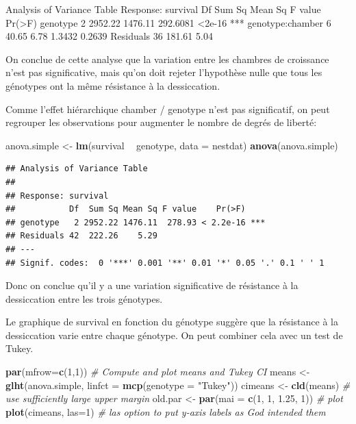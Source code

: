 \documentclass[12pt,]{book}
\newenvironment{Shaded}{\begin{snugshade}}{\end{snugshade}}
\newcommand{\CommentTok}[1]{\textcolor[rgb]{0.37,0.37,0.37}{\textit{#1}}}
\newcommand{\DataTypeTok}[1]{\textcolor[rgb]{0.27,0.27,0.27}{#1}}
\newcommand{\DecValTok}[1]{\textcolor[rgb]{0.06,0.06,0.06}{#1}}
\newcommand{\FloatTok}[1]{\textcolor[rgb]{0.06,0.06,0.06}{#1}}
\newcommand{\KeywordTok}[1]{\textcolor[rgb]{0.27,0.27,0.27}{\textbf{#1}}}
\newcommand{\NormalTok}[1]{#1}
\newcommand{\OperatorTok}[1]{\textcolor[rgb]{0.43,0.43,0.43}{\textbf{#1}}}
\newcommand{\StringTok}[1]{\textcolor[rgb]{0.5,0.5,0.5}{#1}}
\begin{document}
Analysis of Variance Table
Response: survival
Df Sum Sq Mean Sq F value Pr(\textgreater{}F)
genotype
2 2952.22 1476.11 292.6081 \textless{}2e-16 ***
genotype:chamber 6
40.65
6.78
1.3432 0.2639
Residuals
36 181.61
5.04

On conclue de cette analyse que la variation entre les chambres de croissance n'est pas significative, mais qu'on doit rejeter l'hypothèse nulle que tous les génotypes ont la même résistance à la dessiccation.

Comme l'effet hiérarchique chamber / genotype n'est pas significatif, on peut regrouper les observations pour augmenter le nombre de degrés de liberté:

\begin{Shaded}
\begin{Highlighting}[]
\NormalTok{anova.simple <-}\StringTok{ }\KeywordTok{lm}\NormalTok{(survival }\OperatorTok{~}\StringTok{ }\NormalTok{genotype, }\DataTypeTok{data =}\NormalTok{ nestdat)}
\KeywordTok{anova}\NormalTok{(anova.simple)}
\end{Highlighting}
\end{Shaded}

\begin{verbatim}
## Analysis of Variance Table
## 
## Response: survival
##           Df  Sum Sq Mean Sq F value    Pr(>F)    
## genotype   2 2952.22 1476.11  278.93 < 2.2e-16 ***
## Residuals 42  222.26    5.29                      
## ---
## Signif. codes:  0 '***' 0.001 '**' 0.01 '*' 0.05 '.' 0.1 ' ' 1
\end{verbatim}

Donc on conclue qu'il y a une variation significative de résistance à la dessiccation entre les trois génotypes.

Le graphique de survival en fonction du génotype suggère que la résistance à la dessiccation varie entre chaque génotype. On peut combiner cela avec un test de Tukey.

\begin{Shaded}
\begin{Highlighting}[]
\KeywordTok{par}\NormalTok{(}\DataTypeTok{mfrow=}\KeywordTok{c}\NormalTok{(}\DecValTok{1}\NormalTok{,}\DecValTok{1}\NormalTok{))}
\CommentTok{# Compute and plot means and Tukey CI}
\NormalTok{means <-}\StringTok{ }\KeywordTok{glht}\NormalTok{(anova.simple, }\DataTypeTok{linfct =} \KeywordTok{mcp}\NormalTok{(}\DataTypeTok{genotype =}
  \StringTok{"Tukey"}\NormalTok{))}
\NormalTok{cimeans <-}\StringTok{ }\KeywordTok{cld}\NormalTok{(means)}
\CommentTok{# use sufficiently large upper margin}
\NormalTok{old.par <-}\StringTok{ }\KeywordTok{par}\NormalTok{(}\DataTypeTok{mai =} \KeywordTok{c}\NormalTok{(}\DecValTok{1}\NormalTok{, }\DecValTok{1}\NormalTok{, }\FloatTok{1.25}\NormalTok{, }\DecValTok{1}\NormalTok{))}
\CommentTok{# plot}
\KeywordTok{plot}\NormalTok{(cimeans, }\DataTypeTok{las=}\DecValTok{1}\NormalTok{) }\CommentTok{# las option to put y-axis labels as God intended them}
\end{Highlighting}
\end{Shaded}
\end{document}
